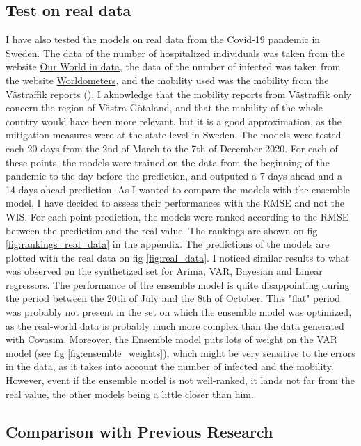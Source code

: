 \subsection{Test on real data}

I have also tested the models on real data from the Covid-19 pandemic in Sweden. 
The data of the number of hospitalized individuals was taken from the website \href{https://ourworldindata.org/covid-hospitalizations}{Our World in data}, the data of the number of infected was taken from the website \href{ https://www.worldometers.info/coronavirus/country/sweden/#coronavirus-cases-linear}{Worldometers}, and the mobility used was the mobility from the Västraffik reports (\cite{gerlee2021predicting}). 
I aknowledge that the mobility reports from Västraffik only concern the region of Västra Götaland, and that the mobility of the whole country would have been more relevant, but it is a good approximation, as the mitigation measures were at the state level in Sweden. 
The models were tested each 20 days from the 2nd of March to the 7th of December 2020. 
For each of these points, the models were trained on the data from the beginning of the pandemic to the day before the prediction, and outputed a 7-days ahead and a 14-days ahead prediction. 
As I wanted to compare the models with the ensemble model, I have decided to assess their performances with the RMSE and not the WIS. 
For each point prediction, the models were ranked according to the RMSE between the prediction and the real value. 
The rankings are shown on fig \ref{fig:rankings_real_data} in the appendix. 
The predictions of the models are plotted with the real data on fig \ref{fig:real_data}.
I noticed similar results to what was observed on the synthetized set for Arima, VAR, Bayesian and Linear regressors.
The performance of the ensemble model is quite disappointing during the period between the 20th of July and the 8th of October. 
This "flat" period was probably not present in the set on which the ensemble model was optimized, as the real-world data is probably much more complex than the data generated with Covasim.
Moreover, the Ensemble model puts lots of weight on the VAR model (see fig \ref{fig:ensemble_weights}), which might be very sensitive to the errors in the data, as it takes into account the number of infected and the mobility.
However, event if the ensemble model is not well-ranked, it lands not far from the real value, the other models being a little closer than him. 

\subsection{Comparison with Previous Research}

